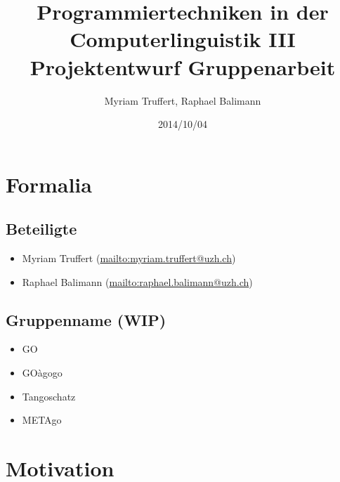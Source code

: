 \documentclass[a4paper]{article}
\title{Programmiertechniken in der Computerlinguistik III \\ Projektentwurf Gruppenarbeit}
\author{Myriam Truffert,  Raphael Balimann}
\date{2014/10/04}
\begin{document}
\maketitle

\section{Formalia}

\subsection{Beteiligte}

\begin{itemize}
	\item Myriam Truffert (\url{mailto:myriam.truffert@uzh.ch})
	\item Raphael Balimann (\url{mailto:raphael.balimann@uzh.ch})
\end{itemize}

\subsection{Gruppenname (WIP)}

\begin{itemize}
	\item GO
	\item GOàgogo
	\item Tangoschatz
	\item METAgo
\end{itemize}

\section{Motivation}
\end{document}

